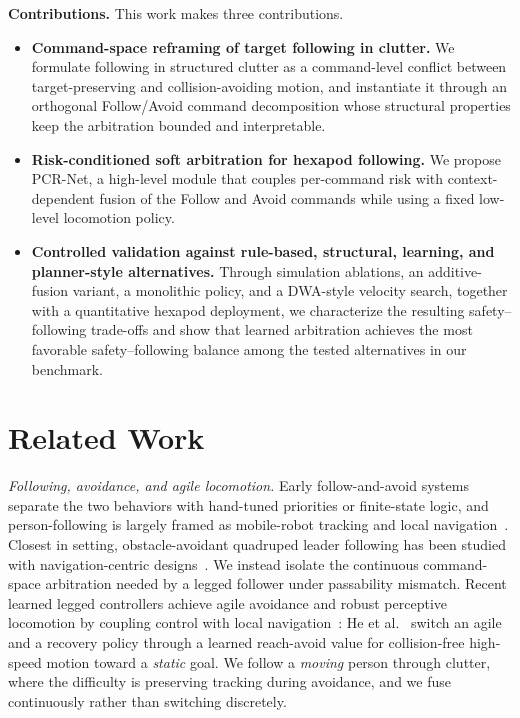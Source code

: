 \documentclass[letterpaper, 10 pt, conference]{ieeeconf}
\begin{document}
\noindent\textbf{Contributions.} This work makes three contributions.
\begin{itemize}
\item \textbf{Command-space reframing of target following in clutter.} We
formulate following in structured clutter as a command-level conflict
between target-preserving and collision-avoiding motion, and instantiate
it through an orthogonal Follow/Avoid command decomposition whose
structural properties keep the arbitration bounded and interpretable.
\item \textbf{Risk-conditioned soft arbitration for hexapod following.} We
propose PCR-Net, a high-level module that couples per-command risk with
context-dependent fusion of the Follow and Avoid commands while using a
fixed low-level locomotion policy.
\item \textbf{Controlled validation against rule-based, structural,
learning, and planner-style alternatives.} Through simulation ablations,
an additive-fusion variant, a monolithic policy, and a DWA-style velocity
search, together with a quantitative hexapod deployment, we characterize
the resulting safety--following trade-offs and show that learned
arbitration achieves the most favorable safety--following balance among
the tested alternatives in our benchmark.
\end{itemize}

\section{Related Work}
\emph{Following, avoidance, and agile locomotion.}
Early follow-and-avoid systems separate the two behaviors with hand-tuned
priorities or finite-state logic, and person-following is largely framed as
mobile-robot tracking and local navigation~\cite{ref:personfollowing}. Closest
in setting, obstacle-avoidant quadruped leader following has been studied with
navigation-centric designs~\cite{ref:leaderfollow}. We instead isolate
the continuous command-space arbitration needed by a legged follower under
passability mismatch. Recent learned legged controllers achieve agile avoidance
and robust perceptive locomotion by coupling control with local
navigation~\cite{ref:abs,ref:miki}: He et al.~\cite{ref:abs}
switch an agile and a recovery policy through a learned reach-avoid value for
collision-free high-speed motion toward a \emph{static} goal. We follow a
\emph{moving} person through clutter, where the difficulty is preserving
tracking during avoidance, and we fuse continuously rather than switching
discretely.
\end{document}
